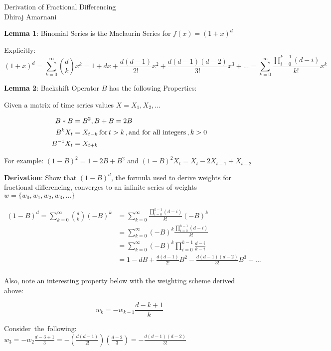 \documentclass{article}
\begin{document}
\begin{center}
{\Large Derivation of Fractional Differencing} \\
\medskip
\bigskip
{\Large Dhiraj Amarnani}
\end{center}

\vspace{0.4in}

{\bf Lemma 1}: Binomial Series is the Maclaurin Series for $f(x) = (1 + x)^d$ 

\bigskip

Explicitly:\\

\begin{equation} 
(1 + x)^d = \sum_{k=0}^{\infty} {d \choose k} x^k = 1 + dx + \frac{d(d-1)}{2!}x^2 + \frac{d(d-1)(d-2)}{3!}x^3 + ... = \sum_{k=0}^{\infty} \frac{\prod_{i=0}^{k-1} (d-i)}{k!} x^k
\end{equation}
 
 \bigskip
 
 {\bf Lemma 2}: Backshift Operator $B$ has the following Properties:
 
 \bigskip
 
 Given a matrix of time series values $X = {X_1, X_2, ...}$
 \bigskip

\begin{equation}
\begin{split}
B*B & = B^2, B + B = 2B\\ 
B^kX_t & = X_{t-k} \thinspace \mbox{for}\thinspace t > k\thinspace, \mbox{and for all integers}\thinspace, k > 0\\
B^{-1}X_t & = X_{t+k}\\
\end{split}
\end{equation}

\bigskip

For example: $(1-B)^2 = 1- 2B + B^2$ and $(1-B)^2 X_t = X_t -2X_{t-1} + X_{t-2}$

\bigskip
	
{\bf Derivation}: Show that $(1-B)^d$, the formula used to derive weights for fractional differencing, converges to an infinite series of weights $w = \{w_0, w_1, w_2, w_3, ...\}$

\bigskip

\begin{equation}
\begin{split}
(1-B)^d = \sum_{k=0}^{\infty} {d \choose k} (-B)^k  & = \sum_{k=0}^{\infty} \frac{\prod_{i=0}^{k-1} (d-i)}{k!}(-B)^k \\
& = \sum_{k=0}^{\infty} (-B)^k \frac{\prod_{i=0}^{k-1} (d-i)}{k!}\\
& = \sum_{k=0}^{\infty} (-B)^k \prod_{i=0}^{k-1} \frac{d-i}{k-i}\\
& = 1 - dB + \frac{d(d-1)}{2!}B^2 - \frac{d(d-1)(d-2)}{3!}B^3 + ... \\
\end{split}
\end{equation}

\bigskip

Also, note an interesting property below with the weighting scheme derived above:

$$w_k  = -w_{k-1} \frac{d-k+1}{k}$$

\medskip

\mbox{Consider the following:}\
$w_3   = -w_2 \frac{d-3+1}{3} = -(\frac{d(d-1)}{2!})(\frac{d-2}{3}) = -\frac{d(d-1)(d-2)}{3!}$
\end{document}
